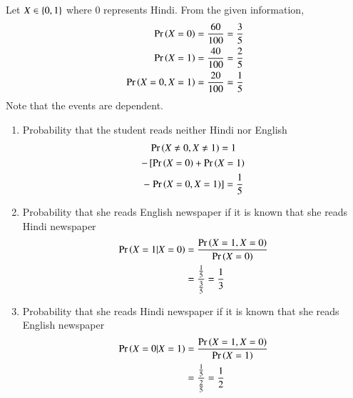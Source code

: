 Let $X \in \left\{0,1\right\}$ where 0 represents Hindi.  From the given information,
\begin{align}
\Pr\left(X = 0\right) &= \frac{60}{100} = \frac{3}{5}
\\
\Pr\left(X = 1\right) &= \frac{40}{100} = \frac{2}{5}
\\
\Pr\left(X = 0, X=1\right) &= \frac{20}{100} = \frac{1}{5}
\end{align}
Note that the events are dependent.
\begin{enumerate}
\item Probability that the student reads neither Hindi nor English
\begin{multline}
\Pr\left(X \ne 0, X \ne 1\right) = 1 
\\
- {}\left[\Pr\left(X=0\right)+\Pr\left(X=1\right)\right.
\\
-{}\left.\Pr\left(X=0,X=1\right)\right]
= \frac{1}{5}
\end{multline}
\item Probability that she reads English newspaper if it is known that she reads Hindi newspaper
\begin{align}
\Pr\left(X=1|X=0\right) &= \frac{\Pr\left(X=1,X=0\right)}{\Pr\left(X=0\right)}
\\
&= \frac{\frac{1}{5}}{\frac{3}{5}}
= \frac{1}{3}
\end{align}
\item Probability that she reads Hindi newspaper if it is known that she reads English newspaper
\begin{align}
\Pr\left(X=0|X=1\right) &= \frac{\Pr\left(X=1,X=0\right)}{\Pr\left(X=1\right)}
\\
&= \frac{\frac{1}{5}}{\frac{2}{5}} = \frac{1}{2}
\end{align}
\end{enumerate}
